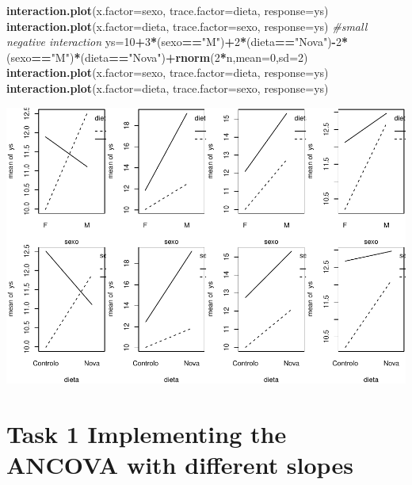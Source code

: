 \documentclass[
]{book}
\newenvironment{Shaded}{\begin{snugshade}}{\end{snugshade}}
\newcommand{\CommentTok}[1]{\textcolor[rgb]{0.56,0.35,0.01}{\textit{#1}}}
\newcommand{\DataTypeTok}[1]{\textcolor[rgb]{0.13,0.29,0.53}{#1}}
\newcommand{\DecValTok}[1]{\textcolor[rgb]{0.00,0.00,0.81}{#1}}
\newcommand{\KeywordTok}[1]{\textcolor[rgb]{0.13,0.29,0.53}{\textbf{#1}}}
\newcommand{\NormalTok}[1]{#1}
\newcommand{\OperatorTok}[1]{\textcolor[rgb]{0.81,0.36,0.00}{\textbf{#1}}}
\newcommand{\StringTok}[1]{\textcolor[rgb]{0.31,0.60,0.02}{#1}}
\begin{document}
\begin{Shaded}
\begin{Highlighting}[]
\KeywordTok{interaction.plot}\NormalTok{(}\DataTypeTok{x.factor=}\NormalTok{sexo, }\DataTypeTok{trace.factor=}\NormalTok{dieta, }\DataTypeTok{response=}\NormalTok{ys)}
\KeywordTok{interaction.plot}\NormalTok{(}\DataTypeTok{x.factor=}\NormalTok{dieta, }\DataTypeTok{trace.factor=}\NormalTok{sexo, }\DataTypeTok{response=}\NormalTok{ys)}
\CommentTok{#small negative interaction}
\NormalTok{ys=}\DecValTok{10}\OperatorTok{+}\DecValTok{3}\OperatorTok{*}\NormalTok{(sexo}\OperatorTok{==}\StringTok{"M"}\NormalTok{)}\OperatorTok{+}\DecValTok{2}\OperatorTok{*}\NormalTok{(dieta}\OperatorTok{==}\StringTok{"Nova"}\NormalTok{)}\OperatorTok{-}\DecValTok{2}\OperatorTok{*}\NormalTok{(sexo}\OperatorTok{==}\StringTok{"M"}\NormalTok{)}\OperatorTok{*}\NormalTok{(dieta}\OperatorTok{==}\StringTok{"Nova"}\NormalTok{)}\OperatorTok{+}\KeywordTok{rnorm}\NormalTok{(}\DecValTok{2}\OperatorTok{*}\NormalTok{n,}\DataTypeTok{mean=}\DecValTok{0}\NormalTok{,}\DataTypeTok{sd=}\DecValTok{2}\NormalTok{)}
\KeywordTok{interaction.plot}\NormalTok{(}\DataTypeTok{x.factor=}\NormalTok{sexo, }\DataTypeTok{trace.factor=}\NormalTok{dieta, }\DataTypeTok{response=}\NormalTok{ys)}
\KeywordTok{interaction.plot}\NormalTok{(}\DataTypeTok{x.factor=}\NormalTok{dieta, }\DataTypeTok{trace.factor=}\NormalTok{sexo, }\DataTypeTok{response=}\NormalTok{ys)}
\end{Highlighting}
\end{Shaded}

\includegraphics{ECOMODbook_files/figure-latex/a11.2-1.pdf}

\hypertarget{task-1-implementing-the-ancova-with-different-slopes}{%
\section{Task 1 Implementing the ANCOVA with different slopes}\label{task-1-implementing-the-ancova-with-different-slopes}}
\end{document}

